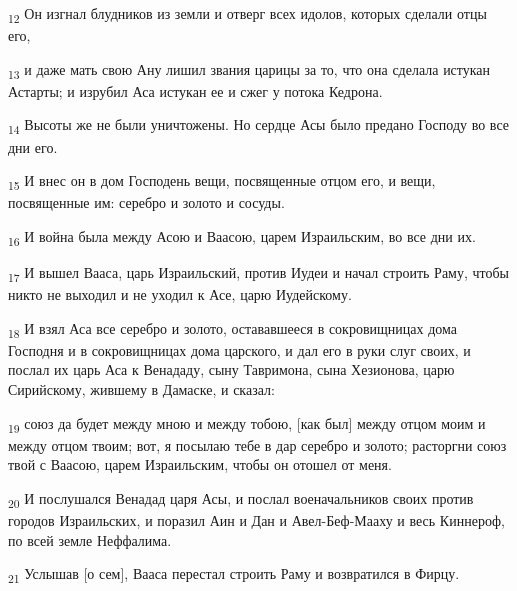 \begin{tcolorbox}
\textsubscript{12} Он изгнал блудников из земли и отверг всех идолов, которых сделали отцы его,
\end{tcolorbox}
\begin{tcolorbox}
\textsubscript{13} и даже мать свою Ану лишил звания царицы за то, что она сделала истукан Астарты; и изрубил Аса истукан ее и сжег у потока Кедрона.
\end{tcolorbox}
\begin{tcolorbox}
\textsubscript{14} Высоты же не были уничтожены. Но сердце Асы было предано Господу во все дни его.
\end{tcolorbox}
\begin{tcolorbox}
\textsubscript{15} И внес он в дом Господень вещи, посвященные отцом его, и вещи, посвященные им: серебро и золото и сосуды.
\end{tcolorbox}
\begin{tcolorbox}
\textsubscript{16} И война была между Асою и Ваасою, царем Израильским, во все дни их.
\end{tcolorbox}
\begin{tcolorbox}
\textsubscript{17} И вышел Вааса, царь Израильский, против Иудеи и начал строить Раму, чтобы никто не выходил и не уходил к Асе, царю Иудейскому.
\end{tcolorbox}
\begin{tcolorbox}
\textsubscript{18} И взял Аса все серебро и золото, остававшееся в сокровищницах дома Господня и в сокровищницах дома царского, и дал его в руки слуг своих, и послал их царь Аса к Венададу, сыну Тавримона, сына Хезионова, царю Сирийскому, жившему в Дамаске, и сказал:
\end{tcolorbox}
\begin{tcolorbox}
\textsubscript{19} союз да будет между мною и между тобою, [как был] между отцом моим и между отцом твоим; вот, я посылаю тебе в дар серебро и золото; расторгни союз твой с Ваасою, царем Израильским, чтобы он отошел от меня.
\end{tcolorbox}
\begin{tcolorbox}
\textsubscript{20} И послушался Венадад царя Асы, и послал военачальников своих против городов Израильских, и поразил Аин и Дан и Авел-Беф-Мааху и весь Киннероф, по всей земле Неффалима.
\end{tcolorbox}
\begin{tcolorbox}
\textsubscript{21} Услышав [о сем], Вааса перестал строить Раму и возвратился в Фирцу.
\end{tcolorbox}
